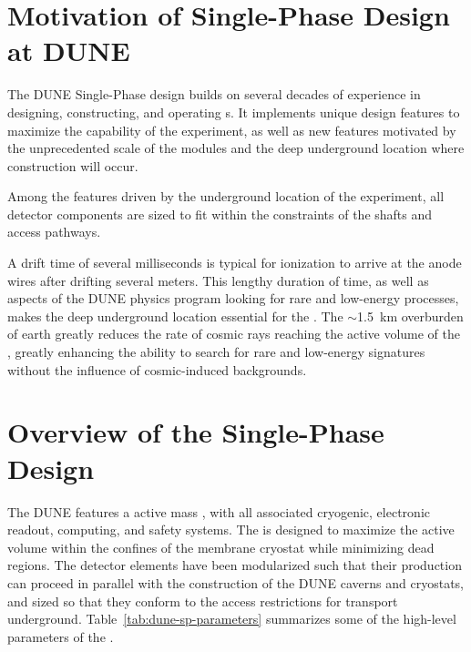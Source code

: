 \section{Motivation of Single-Phase \lartpc Design at DUNE}
\label{sec:fdsp-design-impl}

The DUNE Single-Phase  design builds on several decades of experience in designing, constructing, and operating \lartpc{}s.  It implements unique design features to maximize the capability of the experiment, as well as new features motivated by the unprecedented scale of the  modules and the deep underground location where construction will occur.

Among the features driven by the underground location of the experiment, all detector components are sized to fit within the constraints of the \surf shafts and access pathways.

A drift time of several milliseconds is typical for ionization to arrive at the anode wires after drifting several meters.  This lengthy duration of time, as well as aspects of the DUNE physics program looking for rare and low-energy processes, makes the deep underground location essential for the .  The  $\sim$\SI{1.5}{km} overburden of earth greatly reduces the rate of cosmic rays reaching the active volume of the , greatly enhancing the ability to search for rare and low-energy signatures without the influence of cosmic-induced backgrounds.  


\section{Overview of the Single-Phase Design}
\label{sec:fdsp-ov-model}

The DUNE  features a \nominalmodsize active mass \lartpc, with all associated cryogenic, electronic readout, computing, and safety systems.  The  is designed to maximize the active volume within the confines of the membrane cryostat while minimizing dead regions.  The detector elements have been modularized such that their production can proceed in parallel with the construction of the DUNE caverns and cryostats, and sized so that they conform to the access restrictions for transport underground.  Table~\ref{tab:dune-sp-parameters} summarizes some of the high-level parameters of the .

